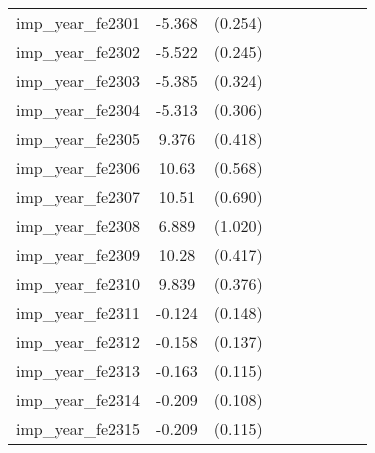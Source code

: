 {\begin{tabular}{l*{4}{cc}}
imp\_year\_fe2301&   -5.368\sym{***}&  (0.254)&                  &         &                  &         &                  &         \\
imp\_year\_fe2302&   -5.522\sym{***}&  (0.245)&                  &         &                  &         &                  &         \\
imp\_year\_fe2303&   -5.385\sym{***}&  (0.324)&                  &         &                  &         &                  &         \\
imp\_year\_fe2304&   -5.313\sym{***}&  (0.306)&                  &         &                  &         &                  &         \\
imp\_year\_fe2305&    9.376\sym{***}&  (0.418)&                  &         &                  &         &                  &         \\
imp\_year\_fe2306&    10.63\sym{***}&  (0.568)&                  &         &                  &         &                  &         \\
imp\_year\_fe2307&    10.51\sym{***}&  (0.690)&                  &         &                  &         &                  &         \\
imp\_year\_fe2308&    6.889\sym{***}&  (1.020)&                  &         &                  &         &                  &         \\
imp\_year\_fe2309&    10.28\sym{***}&  (0.417)&                  &         &                  &         &                  &         \\
imp\_year\_fe2310&    9.839\sym{***}&  (0.376)&                  &         &                  &         &                  &         \\
imp\_year\_fe2311&   -0.124         &  (0.148)&                  &         &                  &         &                  &         \\
imp\_year\_fe2312&   -0.158         &  (0.137)&                  &         &                  &         &                  &         \\
imp\_year\_fe2313&   -0.163         &  (0.115)&                  &         &                  &         &                  &         \\
imp\_year\_fe2314&   -0.209         &  (0.108)&                  &         &                  &         &                  &         \\
imp\_year\_fe2315&   -0.209         &  (0.115)&                  &         &                  &         &                  &         \\

\end{tabular}}
